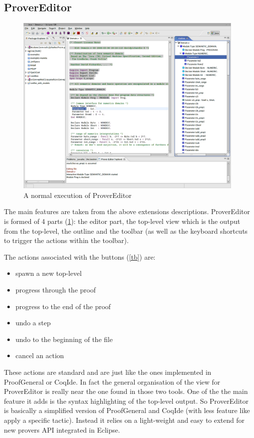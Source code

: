 \documentclass{entcs}
\begin{document}
\subsection{ProverEditor}
\label{subsec:provereditor}
\begin{figure}
\begin{center}
\includegraphics[width=\linewidth]{screenshot1}
\end{center}
  \caption{A normal execution of ProverEditor}
  \label{scrs1}
\end{figure}
The main features are taken from the above extensions descriptions.
ProverEditor is formed of 4 parts (\ref{scrs1}): the editor part, the top-level view
which is the output from the top-level, the outline and the toolbar (as well as the keyboard 
shortcuts to trigger the actions within the toolbar).

The actions associated with the buttons (\ref{tb}) are:
\begin{itemize}
\item spawn a new top-level
\item progress through the proof
\item progress to the end of the proof
\item undo a step
\item undo to the beginning of the file
\item cancel an action
\end{itemize}

These actions are standard and are just like the ones implemented in ProofGeneral
or CoqIde. In fact the general organisation of the view for ProverEditor is 
really near the one found in those two tools. One of the the main feature it adds
is the syntax highlighting of the top-level output. So ProverEditor is basically a simplified
version of ProofGeneral and CoqIde (with less feature like apply a specific tactic).
Instead it relies on a light-weight and easy to extend for new provers API integrated in Eclipse.
\end{document}
